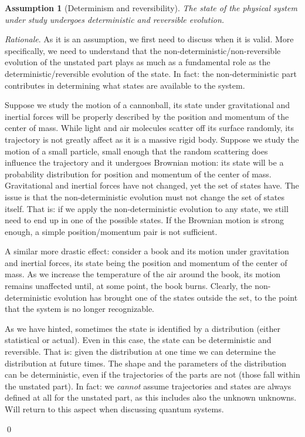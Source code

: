 \documentclass[aps,pra,10pt,twocolumn,floatfix,nofootinbib]{revtex4-1}
\newtheorem{assump}{Assumption}
\theoremstyle{definition}
\newenvironment{rationale}{\emph{Rationale}.}{\qed}
\begin{document}
\begin{assump}[Determinism and reversibility]\label{detrevass}
The state of the physical system under study undergoes deterministic and reversible evolution.
\end{assump}

\begin{rationale}
As it is an assumption, we first need to discuss when it is valid. More specifically, we need to understand that the non-deterministic/non-reversible evolution of the unstated part plays as much as a fundamental role as the deterministic/reversible evolution of the state. In fact: the non-deterministic part contributes in determining what states are available to the system.

Suppose we study the motion of a cannonball, its state under gravitational and inertial forces will be properly described by the position and momentum of the center of mass. While light and air molecules scatter off its surface randomly, its trajectory is not greatly affect as it is a massive rigid body. Suppose we study the motion of a small particle, small enough that the random scattering does influence the trajectory and it undergoes Brownian motion: its state will be a probability distribution for position and momentum of the center of mass. Gravitational and inertial forces have not changed, yet the set of states have. The issue is that the non-deterministic evolution must not change the set of states itself. That is: if we apply the non-deterministic evolution to any state, we still need to end up in one of the possible states. If the Brownian motion is strong enough, a simple position/momentum pair is not sufficient.

A similar more drastic effect: consider a book and its motion under gravitation and inertial forces, its state being the position and momentum of the center of mass. As we increase the temperature of the air around the book, its motion remains unaffected until, at some point, the book burns. Clearly, the non-deterministic evolution has brought one of the states outside the set, to the point that the system is no longer recognizable.

As we have hinted, sometimes the state is identified by a distribution (either statistical or actual). Even in this case, the state can be deterministic and reversible. That is: given the distribution at one time we can determine the distribution at future times. The shape and the parameters of the distribution can be deterministic, even if the trajectories of the parts are not (those fall within the unstated part). In fact: we \emph{cannot} assume trajectories and states are always defined at all for the unstated part, as this includes also the unknown unknowns. Will return to this aspect when discussing quantum systems.


\end{rationale}
\end{document}
